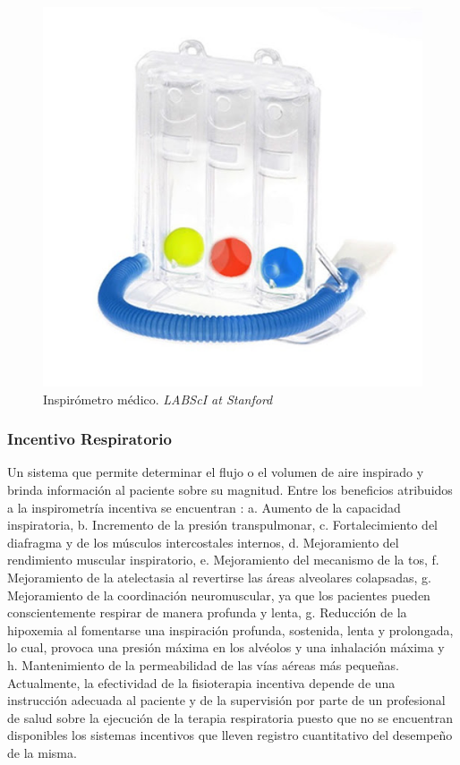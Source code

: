 \begin{figure}[ht]
\centering
\includegraphics[scale=0.4]{inspiromet.jpg}
\caption{Inspir\'ometro m\'edico.\textit{ LABScI at Stanford }}
\label{1}
\end{figure}
\FloatBarrier



\subsubsection{Incentivo Respiratorio}
 
Un sistema que permite determinar el flujo o el volumen de aire inspirado y brinda informaci\'on al paciente sobre su magnitud.  Entre los beneficios atribuidos a la inspirometr\'ia incentiva se encuentran \cite{23}: a. Aumento de la capacidad inspiratoria, b. Incremento de la presi\'on transpulmonar, c. Fortalecimiento del diafragma y de los m\'usculos intercostales internos, d. Mejoramiento del rendimiento muscular inspiratorio, e. Mejoramiento del mecanismo de la tos,  f. Mejoramiento de la atelectasia al revertirse las \'areas alveolares colapsadas, g. Mejoramiento de la coordinaci\'on neuromuscular, ya que los pacientes pueden conscientemente respirar de manera profunda y lenta, g. Reducci\'on de la hipoxemia al fomentarse una inspiraci\'on profunda, sostenida, lenta y prolongada, lo cual, provoca una presi\'on m\'axima en los alv\'eolos y una inhalaci\'on m\'axima y h.  Mantenimiento de la permeabilidad de las v\'ias a\'ereas m\'as peque\~{n}as. Actualmente, la efectividad de la fisioterapia incentiva depende de una instrucci\'on adecuada al paciente y de la supervisi\'on por parte de un profesional de salud sobre la ejecuci\'on de la terapia respiratoria\cite{24} puesto que no se encuentran disponibles los sistemas incentivos que lleven registro cuantitativo del desempe\~{n}o de la misma.

